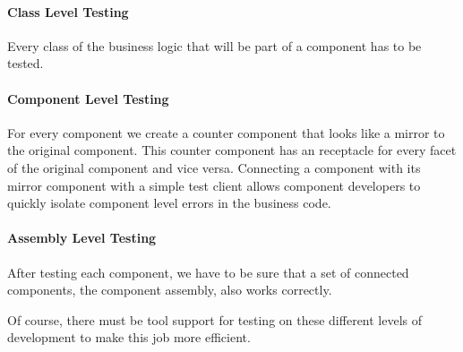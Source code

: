 \paragraph{Class Level Testing}

Every class of the business logic that will be part of a component has to be
tested.

\paragraph{Component Level Testing}

For every component we create a counter component that looks like a mirror to
the original component. This counter component has an receptacle for every facet
of the original component and vice versa. Connecting a component with its mirror
component with a simple test client allows component developers to quickly
isolate component level errors in the business code.

\paragraph{Assembly Level Testing}

After testing each component, we have to be sure that a set of connected
components, the component assembly, also works correctly.

Of course, there must be tool support for testing on these different levels of
development to make this job more efficient.

